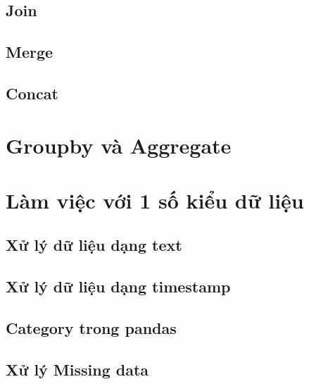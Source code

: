 \documentclass[
]{book}
\begin{document}
\hypertarget{join}{%
\section{Join}\label{join}}

\hypertarget{merge}{%
\section{Merge}\label{merge}}

\hypertarget{concat}{%
\section{Concat}\label{concat}}

\hypertarget{groupby-vuxe0-aggregate}{%
\chapter{Groupby và Aggregate}\label{groupby-vuxe0-aggregate}}

\hypertarget{luxe0m-viux1ec7c-vux1edbi-1-sux1ed1-kiux1ec3u-dux1eef-liux1ec7u}{%
\chapter{Làm việc với 1 số kiểu dữ liệu}\label{luxe0m-viux1ec7c-vux1edbi-1-sux1ed1-kiux1ec3u-dux1eef-liux1ec7u}}

\hypertarget{xux1eed-luxfd-dux1eef-liux1ec7u-dux1ea1ng-text}{%
\section{Xử lý dữ liệu dạng text}\label{xux1eed-luxfd-dux1eef-liux1ec7u-dux1ea1ng-text}}

\hypertarget{xux1eed-luxfd-dux1eef-liux1ec7u-dux1ea1ng-timestamp}{%
\section{Xử lý dữ liệu dạng timestamp}\label{xux1eed-luxfd-dux1eef-liux1ec7u-dux1ea1ng-timestamp}}

\hypertarget{category-trong-pandas}{%
\section{Category trong pandas}\label{category-trong-pandas}}

\hypertarget{xux1eed-luxfd-missing-data}{%
\section{Xử lý Missing data}\label{xux1eed-luxfd-missing-data}}
\end{document}
